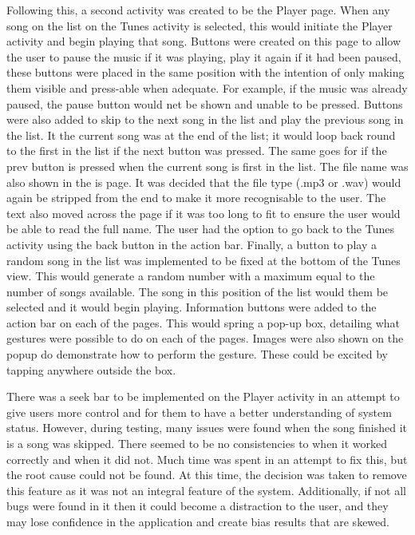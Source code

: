 \documentclass{l4proj}
\begin{document}
Following this, a second activity was created to be the Player page. When any song on the list on the Tunes activity is selected, this would initiate the Player activity and begin playing that song. Buttons were created on this page to allow the user to pause the music if it was playing, play it again if it had been paused, these buttons were placed in the same position with the intention of only making them visible and press-able when adequate. For example, if the music was already paused, the pause button would net be shown and unable to be pressed. Buttons were also added to skip to the next song in the list and play the previous song in the list. It the current song was at the end of the list; it would loop back round to the first in the list if the next button was pressed. The same goes for if the prev button is pressed when the current song is first in the list. The file name was also shown in the is page. It was decided that the file type (.mp3 or .wav) would again be stripped from the end to make it more recognisable to the user. The text also moved across the page if it was too long to fit to ensure the user would be able to read the full name. The user had the option to go back to the Tunes activity using the back button in the action bar. Finally, a button to play a random song in the list was implemented to be fixed at the bottom of the Tunes view. This would generate a random number with a maximum equal to the number of songs available. The song in this position of the list would them be selected and it would begin playing. Information buttons were added to the action bar on each of the pages. This would spring a pop-up box, detailing what gestures were possible to do on each of the pages. Images were also shown on the popup do demonstrate how to perform the gesture. These could be excited by tapping anywhere outside the box.

There was a seek bar to be implemented on the Player activity in an attempt to give users more control and for them to have a better understanding of system status. However, during testing, many issues were found when the song finished it is a song was skipped. There seemed to be no consistencies to when it worked correctly and when it did not. Much time was spent in an attempt to fix this, but the root cause could not be found. At this time, the decision was taken to remove this feature as it was not an integral feature of the system. Additionally, if not all bugs were found in it then it could become a distraction to the user, and they may lose confidence in the application and create bias results that are skewed.
\end{document}
